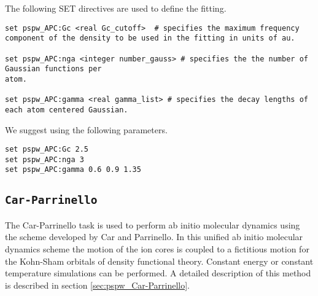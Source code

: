 The following SET directives are used to define the fitting.
\begin{verbatim}
set pspw_APC:Gc <real Gc_cutoff>  # specifies the maximum frequency component of the density to be used in the fitting in units of au.

set pspw_APC:nga <integer number_gauss> # specifies the the number of Gaussian functions per
atom.

set pspw_APC:gamma <real gamma_list> # specifies the decay lengths of each atom centered Gaussian. 
\end{verbatim}

We suggest using the following parameters.
\begin{verbatim}
set pspw_APC:Gc 2.5
set pspw_APC:nga 3
set pspw_APC:gamma 0.6 0.9 1.35 
\end{verbatim}


\subsection{\tt Car-Parrinello}
\label{sec:pspw_CP}
The Car-Parrinello task is used to perform ab initio molecular dynamics
using the scheme developed by Car and Parrinello.  In this unified ab
initio molecular dynamics scheme the motion of the ion cores is coupled to
a fictitious motion for the Kohn-Sham orbitals of density functional
theory.  Constant energy or constant temperature simulations can be
performed.  A detailed description of this method
is described in section \ref{sec:pspw_Car-Parrinello}.

